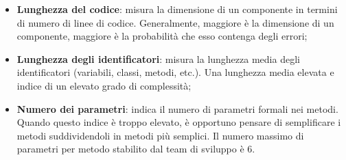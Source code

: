 \begin{itemize}
	\begin{itemize}
		\item \textbf{Lunghezza del codice}: misura la dimensione di un componente in termini di numero di linee di codice. Generalmente, maggiore è la dimensione di un componente, maggiore è la probabilità che esso contenga degli errori;
		\item \textbf{Lunghezza degli identificatori}: misura la lunghezza media degli identificatori (variabili, classi, metodi, etc.). Una lunghezza media elevata e indice di un elevato grado di complessità;
		\item \textbf{Numero dei parametri}: indica il numero di parametri formali nei metodi. Quando questo indice è troppo elevato, è opportuno pensare di semplificare i metodi suddividendoli in metodi più semplici. Il numero massimo di parametri per metodo stabilito dal team di sviluppo è 6.
	\end{itemize}
\end{itemize}
